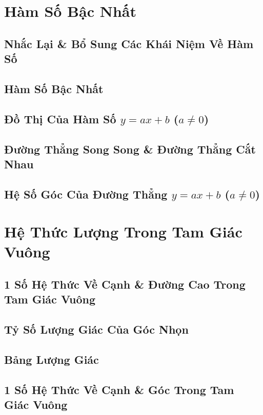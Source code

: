 \documentclass{article}
\numberwithin{equation}{section}
\begin{document}
\section{Hàm Số Bậc Nhất}

\subsection{Nhắc Lại \& Bổ Sung Các Khái Niệm Về Hàm Số}

\subsection{Hàm Số Bậc Nhất}

\subsection{Đồ Thị Của Hàm Số $y = ax + b$ ($a\ne 0$)}

\subsection{Đường Thẳng Song Song \& Đường Thẳng Cắt Nhau}

\subsection{Hệ Số Góc Của Đường Thẳng $y = ax + b$ ($a\ne 0$)}

\section{Hệ Thức Lượng Trong Tam Giác Vuông}

\subsection{1 Số Hệ Thức Về Cạnh \& Đường Cao Trong Tam Giác Vuông}

\subsection{Tỷ Số Lượng Giác Của Góc Nhọn}

\subsection{Bảng Lượng Giác}

\subsection{1 Số Hệ Thức Về Cạnh \& Góc Trong Tam Giác Vuông}
\end{document}
